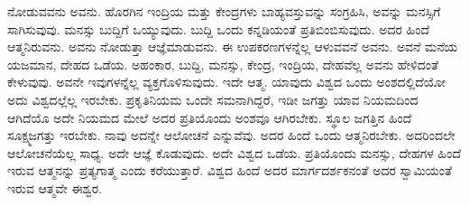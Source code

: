 ನೋಡುವವನು ಅವನು. ಹೊರಗಿನ ಇಂದ್ರಿಯ ಮತ್ತು ಕೇಂದ್ರಗಳು ಬಾಹ್ಯವಸ್ತುವನ್ನು ಸಂಗ್ರಹಿಸಿ, ಅವನ್ನು ಮನಸ್ಸಿಗೆ ಸಾಗಿಸುವುವು. ಮನಸ್ಸು ಬುದ್ದಿಗೆ ಒಯ್ಯುವುದು. ಬುದ್ದಿ ಒಂದು ಕನ್ನಡಿಯಂತೆ ಪ್ರತಿಬಿಂಬಿಸುವುದು. ಅದರ ಹಿಂದೆ ಆತ್ಮನಿರುವನು. ಅವನು ನೋಡುತ್ತಾ ಆಜ್ಞೆಮಾಡುವನು. ಈ ಉಪಕರಣಗಳನ್ನೆಲ್ಲ ಆಳುವವನೆ ಅವನು. ಅವನೆ ಮನೆಯ ಯಜಮಾನ, ದೇಹದ ಒಡೆಯ. ಅಹಂಕಾರ, ಬುದ್ದಿ, ಮನಸ್ಸು, ಕೇಂದ್ರ, ಇಂದ್ರಿಯ, ದೇಹವೆಲ್ಲ ಅವನು ಹೇಳಿದಂತೆ ಕೇಳುವುವು. ಅವನೇ ಇವುಗಳನ್ನೆಲ್ಲ ವ್ಯಕ್ತಗೊಳಿಸುವುದು. ಇದೇ ಆತ್ಮ. ಯಾವುದು ವಿಶ್ವದ ಒಂದು ಅಂಶದಲ್ಲಿದೆಯೋ ಅದು ವಿಶ್ವದಲ್ಲೆಲ್ಲ ಇರಬೇಕು. ಪ್ರಕೃತಿನಿಯಮ ಒಂದೇ ಸಮನಾಗಿದ್ದರೆ, ಇಡೀ ಜಗತ್ತು ಯಾವ ನಿಯಮದಿಂದ ಆಗಿದೆಯೊ ಅದೇ ನಿಯಮದ ಮೇಲೆ ಅದರ ಪ್ರತಿಯೊಂದು ಅಂಶವೂ ಆಗಿರಬೇಕು. ಸ್ಥೂಲ ಜಗತ್ತಿನ ಹಿಂದೆ ಸೂಕ್ಷ್ಮಜಗತ್ತು ಇರಬೇಕು. ನಾವು ಅದನ್ನೇ ಆಲೋಚನೆ ಎನ್ನುವೆವು. ಅದರ ಹಿಂದೆ ಒಂದು ಆತ್ಮನಿರಬೇಕು. ಅದರಿಂದಲೇ ಆಲೋಚನೆಯೆಲ್ಲ ಸಾಧ್ಯ. ಅದೇ ಆಜ್ಞೆ ಕೊಡುವುದು. ಅದೇ ವಿಶ್ವದ ಒಡೆಯ. ಪ್ರತಿಯೊಂದು ಮನಸ್ಸು, ದೇಹಗಳ ಹಿಂದೆ ಇರುವ ಆತ್ಮನನ್ನು ಪ್ರತ್ಯಗಾತ್ಮ ಎಂದು ಕರೆಯುತ್ತಾರೆ. ವಿಶ್ವದ ಹಿಂದೆ ಅದರ ಮಾರ್ಗದರ್ಶಕನಂತೆ ಅದರ ಸ್ವಾಮಿಯಂತೆ ಇರುವ ಆತ್ಮವೇ ಈಶ್ವರ.

\newpage

